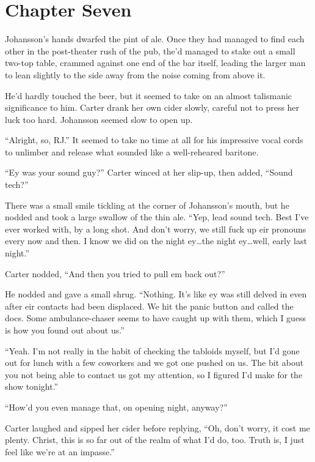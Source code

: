 \chapter*{Chapter Seven}

Johansson's hands dwarfed the pint of ale.  Once they had managed to find each other in the post-theater rush of the pub, the'd managed to stake out a small two-top table, crammed against one end of the bar itself, leading the larger man to lean slightly to the side away from the noise coming from above it.

He'd hardly touched the beer, but it seemed to take on an almost talismanic significance to him.  Carter drank her own cider slowly, careful not to press her luck too hard.  Johansson seemed slow to open up.

``Alright, so, RJ.''  It seemed to take no time at all for his impressive vocal cords to unlimber and release what sounded like a well-reheared baritone.

``Ey was your sound guy?''  Carter winced at her slip-up, then added, ``Sound tech?''

There was a small smile tickling at the corner of Johansson's mouth, but he nodded and took a large swallow of the thin ale.  ``Yep, lead sound tech.  Best I've ever worked with, by a long shot.  And don't worry, we still fuck up eir pronouns every now and then.  I know we did on the night ey\ldots{}the night ey\ldots{}well, early last night.''

Carter nodded, ``And then you tried to pull em back out?''

He nodded and gave a small shrug.  ``Nothing.  It's like ey was still delved in even after eir contacts had been displaced.  We hit the panic button and called the docs.  Some ambulance-chaser seems to have caught up with them, which I guess is how you found out about us.''

``Yeah.  I'm not really in the habit of checking the tabloids myself, but I'd gone out for lunch with a few coworkers and we got one pushed on us.  The bit about you not being able to contact us got my attention, so I figured I'd make for the show tonight.''

``How'd you even manage that, on opening night, anyway?''

Carter laughed and sipped her cider before replying, ``Oh, don't worry, it cost me plenty.  Christ, this is so far out of the realm of what I'd do, too.  Truth is, I just feel like we're at an impasse.''

